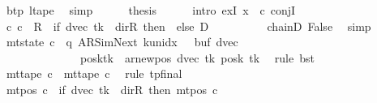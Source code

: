 \begin{isabellebody}
\ btp\ ltape\ \isamarkupfalse%
\ simp\isanewline
\ \ \ \ \isamarkupfalse%
\ {\isacharquery}{\kern0pt}thesis\isanewline
\ \ \ \ \isamarkupfalse%
\ {\isacharparenleft}{\kern0pt}intro\ exI{\isacharbrackleft}{\kern0pt}\ x\ {\isacharequal}{\kern0pt}\ c{\isacharprime}{\kern0pt}{\isacharbrackright}{\kern0pt}\ conjI{\isacharparenright}{\kern0pt}\isanewline
\ \ \ \ \ \ \isamarkupfalse%
\ {\isachardoublequoteopen}{\isacharparenleft}{\kern0pt}c{}{\isacharcomma}{\kern0pt}\ c{\isacharprime}{\kern0pt}{\isacharparenright}{\kern0pt}\ {\isasymin}\ {\isacharquery}{\kern0pt}R\ {\isacharcircum}{\kern0pt}{\isacharcircum}{\kern0pt}\ {\isacharparenleft}{\kern0pt}if\ dvec\ tk\ {\isacharequal}{\kern0pt}\ dir{\isachardot}{\kern0pt}R\ then\ {}\ else\ {\isacharquery}{\kern0pt}D{\isacharparenright}{\kern0pt}{\isachardoublequoteclose}\isanewline
\ \ \ \ \ \ \ \ \isamarkupfalse%
\ chainD\ False\ \isamarkupfalse%
\ simp\isanewline
\ \ \ \ \ \ \isamarkupfalse%
\ {\isachardoublequoteopen}mt{\isacharunderscore}{\kern0pt}state\ c{\isacharprime}{\kern0pt}\ {\isacharequal}{\kern0pt}\ {\isacharparenleft}{\kern0pt}q{\isacharcomma}{\kern0pt}\ AR{\isacharunderscore}{\kern0pt}SimNext{\isacharcomma}{\kern0pt}\ k{\isacharunderscore}{\kern0pt}unidx\ {}{\isacharcomma}{\kern0pt}\ {}{\isacharcomma}{\kern0pt}\ buf{\isacharcomma}{\kern0pt}\ dvec{\isacharcomma}{\kern0pt}\isanewline
\ \ \ \ \ \ \ \ \ \ \ \ \ \ posk{\isacharparenleft}{\kern0pt}tk\ {\isacharcolon}{\kern0pt}{\isacharequal}{\kern0pt}\ ar{\isacharunderscore}{\kern0pt}newpos\ {\isacharparenleft}{\kern0pt}dvec\ tk{\isacharparenright}{\kern0pt}\ {\isacharparenleft}{\kern0pt}posk\ tk{\isacharparenright}{\kern0pt}{\isacharparenright}{\kern0pt}{\isacharparenright}{\kern0pt}{\isachardoublequoteclose}\ \isamarkupfalse%
\ {\isacharparenleft}{\kern0pt}rule\ bst{\isacharparenright}{\kern0pt}\isanewline
\ \ \ \ \ \ \isamarkupfalse%
\ {\isachardoublequoteopen}mt{\isacharunderscore}{\kern0pt}tape\ c{\isacharprime}{\kern0pt}\ {\isacharequal}{\kern0pt}\ mt{\isacharunderscore}{\kern0pt}tape\ c{}{\isachardoublequoteclose}\ \isamarkupfalse%
\ {\isacharparenleft}{\kern0pt}rule\ tp{\isacharunderscore}{\kern0pt}final{\isacharparenright}{\kern0pt}\isanewline
\ \ \ \ \ \ \isamarkupfalse%
\ {\isachardoublequoteopen}mt{\isacharunderscore}{\kern0pt}pos\ c{\isacharprime}{\kern0pt}\ {\isacharequal}{\kern0pt}\ {\isacharparenleft}{\kern0pt}if\ dvec\ tk\ {\isacharequal}{\kern0pt}\ dir{\isachardot}{\kern0pt}R\ then\ mt{\isacharunderscore}{\kern0pt}pos\ c{}\isanewline

\end{isabellebody}
